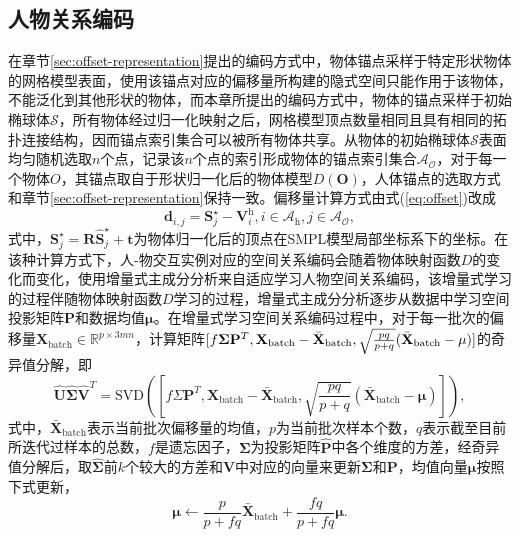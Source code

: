 \subsection{人物关系编码}
在章节\ref{sec:offset-representation}提出的编码方式中，物体锚点采样于特定形状物体的网格模型表面，使用该锚点对应的偏移量所构建的隐式空间只能作用于该物体，不能泛化到其他形状的物体，而本章所提出的编码方式中，物体的锚点采样于初始椭球体$\mathcal{S}$，所有物体经过归一化映射之后，网格模型顶点数量相同且具有相同的拓扑连接结构，因而锚点索引集合可以被所有物体共享。从物体的初始椭球体$\mathcal{S}$表面均匀随机选取$n$个点，记录该$n$个点的索引形成物体的锚点索引集合$\mathcal{A}_{\mathcal{O}}$，对于每一个物体$O$，其锚点取自于形状归一化后的物体模型$D(\mathbf{O})$，人体锚点的选取方式和章节\ref{sec:offset-representation}保持一致。偏移量计算方式由式(\ref{eq:offset})改成
\begin{equation}
	\mathbf{d}_{i,j} = \mathbf{S}^{\star}_j - \mathbf{V}_i^{\text{h}}, i \in \mathcal{A}_{\text{h}}, j \in \mathcal{A}_{\mathcal{O}},
\end{equation}
式中，$\mathbf{S}^\star_j = \mathbf{R} \hat{\mathbf{S}}^\star_j + \mathbf{t}$为物体归一化后的顶点在SMPL模型局部坐标系下的坐标。在该种计算方式下，人-物交互实例对应的空间关系编码会随着物体映射函数$D$的变化而变化，使用增量式主成分分析\citep{Ross2008IncrementalLF}来自适应学习人物空间关系编码，该增量式学习的过程伴随物体映射函数$D$学习的过程，增量式主成分分析逐步从数据中学习空间投影矩阵$\mathbf{P}$和数据均值$\mathbf{\mu}$。在增量式学习空间关系编码过程中，对于每一批次的偏移量$\mathbf{X}_{\text{batch}} \in \mathbb{R}^{p \times 3mn}$，计算矩阵$[f\mathbf{\Sigma} \mathbf{P}^T,\\ \mathbf{X}_{\text{batch}} - \bar{\mathbf{X}}_{\text{batch}}, \sqrt{\frac{pq}{p + q}}(\bar{\mathbf{X}}_{\text{batch}} - \mathbf{\mu})]$的奇异值分解，即
\begin{equation}
	\hat{\mathbf{U}}\hat{\mathbf{\Sigma}}\hat{\mathbf{V}}^T = \text{SVD}([f\Sigma \mathbf{P}^T, \mathbf{X}_{\text{batch}} - \bar{\mathbf{X}}_{\text{batch}}, \sqrt{\frac{pq}{p + q}}(\bar{\mathbf{X}}_{\text{batch}} - \mathbf{\mu})]),
\end{equation}
式中，$\bar{\mathbf{X}}_{\text{batch}}$表示当前批次偏移量的均值，$p$为当前批次样本个数，$q$表示截至目前所迭代过样本的总数，$f$是遗忘因子，$\mathbf{\Sigma}$为投影矩阵$\hat{\mathbf{P}}$中各个维度的方差，经奇异值分解后，取$\hat{\mathbf{\Sigma}}$前$k$个较大的方差和$\mathbf{V}$中对应的向量来更新$\mathbf{\Sigma}$和$\mathbf{\mathbf{P}}$，均值向量$\mathbf{\mu}$按照下式更新，
\begin{equation}
	\mathbf{\mu} \gets \frac{p}{p + fq} \bar{\mathbf{X}}_{\text{batch}} + \frac{fq}{p + fq}\mathbf{\mu}.
\end{equation}

